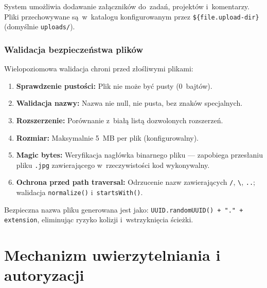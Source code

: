System umożliwia dodawanie załączników do~zadań, projektów i~komentarzy. Pliki przechowywane są~w~katalogu konfigurowanym przez \texttt{\$\{file.upload-dir\}} (domyślnie \texttt{uploads/}).

\subsubsection{Walidacja bezpieczeństwa plików}

Wielopoziomowa walidacja chroni przed złośliwymi plikami:

\begin{enumerate}
    \item \textbf{Sprawdzenie pustości:} Plik nie może być pusty (0~bajtów).
    \item \textbf{Walidacja nazwy:} Nazwa nie null, nie pusta, bez znaków specjalnych.
    \item \textbf{Rozszerzenie:} Porównanie z~białą listą dozwolonych rozszerzeń.
    \item \textbf{Rozmiar:} Maksymalnie 5~MB per plik (konfigurowalny).
    \item \textbf{Magic bytes:} Weryfikacja nagłówka binarnego pliku --- zapobiega przesłaniu pliku \texttt{.jpg} zawierającego w~rzeczywistości kod wykonywalny.
    \item \textbf{Ochrona przed path traversal:} Odrzucenie nazw zawierających \texttt{/}, \texttt{\textbackslash}, \texttt{..}; walidacja \texttt{normalize()} i~\texttt{startsWith()}.
\end{enumerate}

Bezpieczna nazwa pliku generowana jest jako: \texttt{UUID.randomUUID() + "." + extension}, eliminując ryzyko kolizji i~wstrzyknięcia ścieżki.

\section{Mechanizm uwierzytelniania i autoryzacji}

